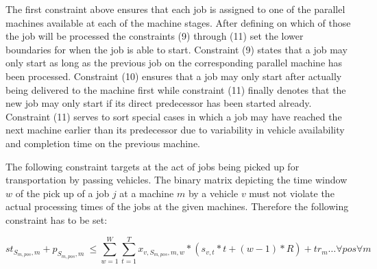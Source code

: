 The first constraint above ensures that each job is assigned to one of the parallel machines available at each of the machine stages. After defining
on which of those the job will be processed the constraints (9) through (11) set the lower boundaries for when the job is able to start. Constraint
(9) states that a job may only start as long as the previous job on the corresponding parallel machine has been processed. Constraint (10) ensures
that a job may only start after actually being delivered to the machine first while constraint (11) finally denotes that the new job may only start
if its direct predecessor has been started already. Constraint (11) serves to sort special cases in which a job may have reached the next machine
earlier than its predecessor due to variability in vehicle availability and completion time on the previous machine.

The following constraint targets at the act of jobs being picked up for transportation by passing vehicles. The binary matrix depicting the
time window \(w\) of the pick up of a job \(j\) at a machine \(m\) by a vehicle \(v\) must not violate the actual processing times of the jobs at
the given machines. Therefore the following constraint has to be set:

\begin{equation}
  st_{S_{m,pos},m} + p_{S_{m,pos},m}\> \leq \sum_{w=1}^{W}\sum_{t=1}^{T} x_{v,S_{m,pos},m,w} * (s_{v,t} * t + (w-1) * R) + tr_{m} \ldots \forall pos \forall m
\end{equation}